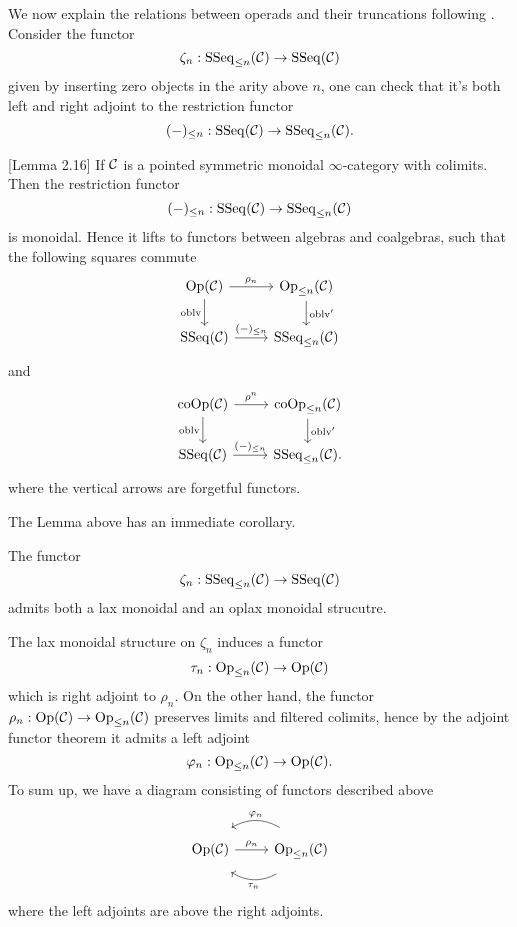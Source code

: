 We now explain the relations between operads and their truncations following \cite{Heuts_Koszul}.
Consider the functor 
$$
\zeta_n: \operatorname{SSeq}_{\leq n}({\mathcal{C}}) \to \operatorname{SSeq}({\mathcal{C}})
$$
given by inserting zero objects in the arity above $n$, one can check that it's both left and right adjoint to the restriction functor
$$
(-)_{\leq n}: \operatorname{SSeq}({\mathcal{C}}) \to 
\operatorname{SSeq}_{\leq n}({\mathcal{C}}).
$$

\begin{lemma}
	\cite{Hadrianphdthesis}[Lemma 2.16]
	If ${\mathcal{C}}$ is a pointed symmetric monoidal $\infty$-category with colimits.
	Then the restriction functor
$$
(-)_{\leq n}: \operatorname{SSeq}({\mathcal{C}}) \to 
\operatorname{SSeq}_{\leq n}({\mathcal{C}})
$$
	is monoidal. Hence it lifts to functors between algebras and coalgebras,
	such that the following squares commute
\[
\begin{tikzcd}
	\Opd(\CC)  & 
	\operatorname{Op}_{\leq n}(\CC)\\
	\SSeq(\CC) & \SSeq_{\leq n}(\CC)
	\arrow[from=1-1, to= 1-2, "\rho_n"]
	\arrow[from=1-1, to=2-1, "\oblv" left]
	\arrow[from=1-2, to=2-2, "\oblv'" ]
	\arrow[from=2-1, to= 2-2, "(-)_{\leq n}"]
\end{tikzcd}
\]
and
\[
\begin{tikzcd}
	 \Coop(\CC)  & 
	\operatorname{coOp}_{\leq n}(\CC)\\
	\SSeq(\CC) & \SSeq_{\leq n}(\CC)
	\arrow[from=1-1, to= 1-2, "\rho^n"]
	\arrow[from=1-1, to=2-1, "\oblv" left]
	\arrow[from=1-2, to=2-2, "\oblv'" ]
	\arrow[from=2-1, to= 2-2, "(-)_{\leq n}"].
\end{tikzcd}
\]
where the vertical arrows are forgetful functors.
\end{lemma}

The Lemma above has an immediate corollary.
\begin{corollary}
\label{functors between operads adn their truncations}
    The functor 
    $$
    \zeta_n: \operatorname{SSeq}_{\leq n}({\mathcal{C}}) \to \operatorname{SSeq}({\mathcal{C}})
    $$
    admits both a lax monoidal and an oplax monoidal strucutre. 
\end{corollary}
    The lax monoidal structure on $\zeta_n$ induces a functor
    $$
    \tau_{n}:\operatorname{Op}_{\leq n}({\mathcal{C}})
    \to 
    \operatorname{Op}({\mathcal{C}})
    $$
    which is right adjoint to $\rho_{n}$. On the other hand, the functor $\rho_n:\operatorname{Op}({\mathcal{C}}) \to \operatorname{Op}_{\leq n}({\mathcal{C}})$ preserves limits and filtered colimits, hence by the adjoint functor theorem \cite[Corollary 5.5.2.9.]{HTT} it admits a left adjoint 
    $$
    \varphi_n: \operatorname{Op}_{\leq n}({\mathcal{C}})
    \to 
    \operatorname{Op}({\mathcal{C}}).
    $$
    To sum up, we have a diagram consisting of functors described above
\begin{equation}
\label{Op-Op_n adjunction}
	\begin{tikzcd}
 \Opd(\CC) & \operatorname{Op}_{\leq n}(\CC) 
	\arrow[from=1-2, to= 1-1, bend right, shift right = 3, "\varphi_n" above]
	\arrow[from=1-2, to=1-1, bend left, shift left = 3, "\tau_n" below]
	\arrow[from=1-1, to=1-2, "\rho_n"]
\end{tikzcd}
\end{equation}
where the left adjoints are above the right adjoints.
    

